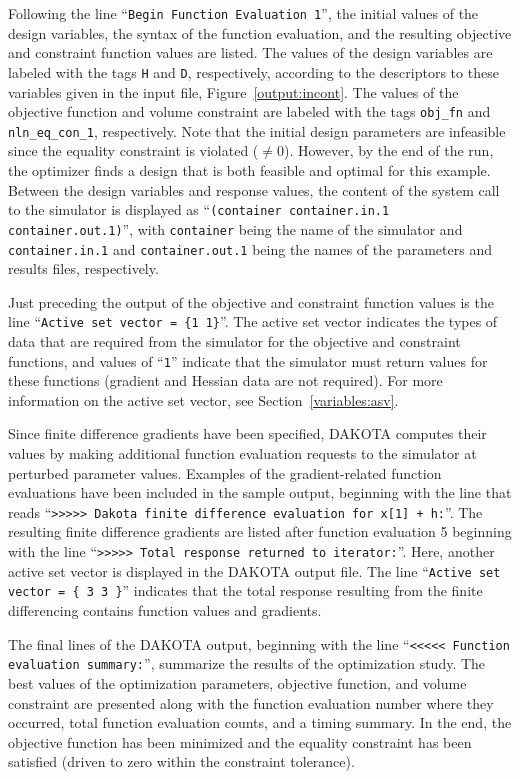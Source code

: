 Following the line ``\texttt{Begin Function Evaluation 1}'', the
initial values of the design variables, the syntax of the function
evaluation, and the resulting objective and constraint function values
are listed. The values of the design variables are labeled with the
tags \texttt{H} and \texttt{D}, respectively, according to the
descriptors to these variables given in the input file,
Figure~\ref{output:incont}.  The values of the objective function
and volume constraint are labeled with the tags
\texttt{obj\_fn} and \texttt{nln\_eq\_con\_1}, respectively. Note that
the initial design parameters are infeasible since the equality
constraint is violated ($\ne 0$). However, by the end of the run, the
optimizer finds a design that is both feasible and optimal for this
example. Between the design variables and response values, the content
of the system call to the simulator is displayed as
``\texttt{(container container.in.1 container.out.1)}'', with
\texttt{container} being the name of the simulator and
\texttt{container.in.1} and \texttt{container.out.1} being the names
of the parameters and results files, respectively.

Just preceding the output of the objective and constraint function
values is the line ``\texttt{Active set vector = \{1 1\}}''. The
active set vector indicates the types of data that are required from
the simulator for the objective and constraint functions, and values
of ``\texttt{1}'' indicate that the simulator must return values for
these functions (gradient and Hessian data are not required). For more
information on the active set vector, see Section~\ref{variables:asv}.

Since finite difference gradients have been specified, DAKOTA computes
their values by making additional function evaluation requests to the
simulator at perturbed parameter values. Examples of the
gradient-related function evaluations have been included in the sample
output, beginning with the line that reads ``\texttt{>>>>> Dakota
  finite difference evaluation for x[1] + h:}''. The resulting finite
difference gradients are listed after function evaluation 5 beginning
with the line ``\texttt{>>>>> Total response returned to iterator:}''.
Here, another active set vector is displayed in the DAKOTA output
file. The line ``\texttt{Active set vector = \{ 3 3 \}}'' indicates
that the total response resulting from the finite differencing
contains function values and gradients.

The final lines of the DAKOTA output, beginning with the line
``\texttt{<<<<< Function evaluation summary:}'', summarize the
results of the optimization study. The best values of the optimization
parameters, objective function, and volume constraint are presented
along with the function evaluation number where they occurred, total
function evaluation counts, and a timing summary. In the end, the
objective function has been minimized and the equality constraint has
been satisfied (driven to zero within the constraint tolerance).

